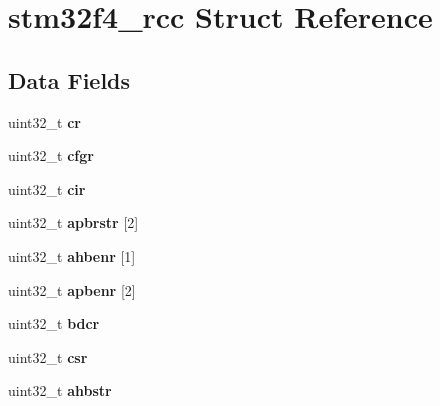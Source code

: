 \hypertarget{structstm32f4__rcc}{}\section{stm32f4\+\_\+rcc Struct Reference}
\label{structstm32f4__rcc}
\subsection*{Data Fields}
\begin{DoxyCompactItemize}
\item 
\mbox{\label{structstm32f4__rcc_ad4f389afdfecd0baaab396d3295ae091}} 
uint32\+\_\+t {\bfseries cr}
\item 
\mbox{\label{structstm32f4__rcc_a125b9e289e091f1e79a9afb23aed546d}} 
uint32\+\_\+t {\bfseries cfgr}
\item 
\mbox{\label{structstm32f4__rcc_a2434c118ae03fb00720b0ce61ebda880}} 
uint32\+\_\+t {\bfseries cir}
\item 
\mbox{\label{structstm32f4__rcc_a1a708830870882f214c66868b7de481d}} 
uint32\+\_\+t {\bfseries apbrstr} \mbox{[}2\mbox{]}
\item 
\mbox{\label{structstm32f4__rcc_a413bbca96f7a655d6149fb387f05bbaa}} 
uint32\+\_\+t {\bfseries ahbenr} \mbox{[}1\mbox{]}
\item 
\mbox{\label{structstm32f4__rcc_a5350346ee8b1db38b6b39728cd49e742}} 
uint32\+\_\+t {\bfseries apbenr} \mbox{[}2\mbox{]}
\item 
\mbox{\label{structstm32f4__rcc_aad00189d0e4051e3105ac6f628ff2ec7}} 
uint32\+\_\+t {\bfseries bdcr}
\item 
\mbox{\label{structstm32f4__rcc_a51e2b245f2882ade88590eb9cd3bf62c}} 
uint32\+\_\+t {\bfseries csr}
\item 
\mbox{\label{structstm32f4__rcc_aefdc28ffdc12b867e6fdf54a3fff3dcd}} 
uint32\+\_\+t {\bfseries ahbstr}
\item 
\mbox{\label{structstm32f4__rcc_a7fa45940f719236e022bacbefdbd4f35}} 

\end{DoxyCompactItemize}
